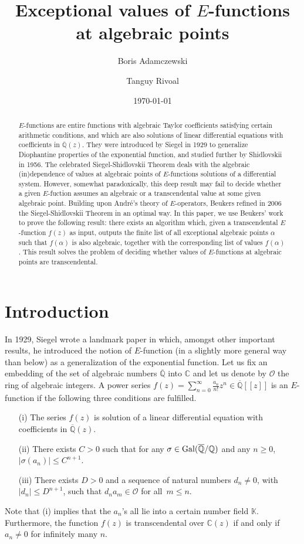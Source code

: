 \documentclass[reqno,english,12pt,a4paper]{smfart}
\author{Boris Adamczewski}
\author{Tanguy Rivoal}
\title{Exceptional values of $E$-functions at algebraic points}
\date{\today}
\numberwithin{equation}{section}
\def\Qbar{\overline{\mathbb Q}}
\def\K{\mathbb K}
\begin{document}
\begin{abstract} $E$-functions are entire functions with algebraic Taylor coefficients satisfying certain arithmetic conditions, and which are also solutions of  linear differential equations with coefficients in $\Qbar(z)$. They were introduced by Siegel in 1929  to generalize Diophantine properties of the exponential function, and studied further by Shidlovskii in 1956. The celebrated Siegel-Shidlovskii Theorem deals with the algebraic (in)dependence of values at algebraic points of $E$-functions solutions of a differential system. However, somewhat paradoxically, 
this deep result may fail to decide whether a given $E$-fuction assumes an algebraic or  a transcendental value at some given algebraic point. Building upon Andr\'e's theory of $E$-operators, Beukers refined in 2006 the Siegel-Shidlovskii Theorem in an optimal way. In this paper, we use Beukers' work to prove the following result: there exists an algorithm which, given a transcendental $E$-function $f(z)$ as input, outputs the finite list of all exceptional algebraic points $\alpha$ such that $f(\alpha)$ is also algebraic, together with the corresponding list of values $f(\alpha)$. This result solves the problem of  deciding whether values of $E$-functions at algebraic points are transcendental.
\end{abstract}


\maketitle

\section{Introduction}

In 1929, Siegel \cite{Siegel} wrote a landmark paper in which, amongst other important results, he introduced the notion of 
$E$-function (in a slightly more general way than below) as a generalization of the exponential function. 
Let us fix an embedding of the set of algebraic numbers $\Qbar$ into $\mathbb C$ and let us denote by 
$\mathcal O$ the ring of algebraic integers.   
A power series $f(z)=\sum_{n=0}^{\infty} \frac{a_n}{n!} z^n \in \Qbar[[z]]$ is an $E$-function if the following three conditions are fulfilled. 
\begin{enumerate}
\item[(i)] The series $f(z)$ is solution of a linear differential equation with coefficients in 
$\Qbar(z)$.
\item[(ii)] There exists $C>0$ such that for any $\sigma\in \textup{Gal}(\Qbar/\mathbb Q)$ and any $n\ge 0$,  $\vert \sigma(a_n)\vert \leq C^{n+1}$.
\item[(iii)] There exists $D>0$ and a sequence of natural numbers $d_n\neq 0$, with $\vert d_n \vert \leq D^{n+1}$, such that
$d_na_m\in \mathcal{O}$ for all~$m\le n$.
\end{enumerate}
Note that (i) implies that the $a_n$'s all lie into a certain number field $\K$. Furthermore, the function $f(z)$ is transcendental over $\mathbb C(z)$ if and only if $a_n\neq 0$ for infinitely many $n$. 
\end{document}
